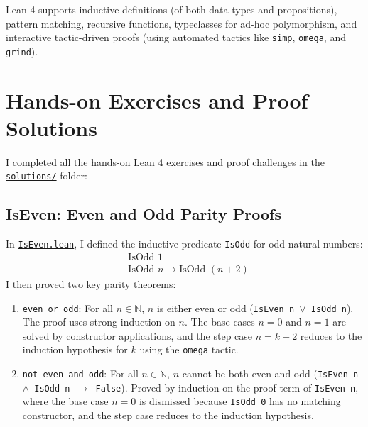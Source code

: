 \documentclass{article}
\begin{document}
Lean 4 supports inductive definitions (of both data types and propositions), pattern matching, recursive functions, typeclasses for ad-hoc polymorphism, and interactive tactic-driven proofs (using automated tactics like \texttt{simp}, \texttt{omega}, and \texttt{grind}).

\section{Hands-on Exercises and Proof Solutions}
I completed all the hands-on Lean 4 exercises and proof challenges in the \href{file:///home/scorzion/Tech/Crypto/SKC_IITH/Day9/solutions/}{\texttt{solutions/}} folder:

\subsection{IsEven: Even and Odd Parity Proofs}
In \href{file:///home/scorzion/Tech/Crypto/SKC_IITH/Day9/solutions/IsEven.lean}{\texttt{IsEven.lean}}, I defined the inductive predicate \texttt{IsOdd} for odd natural numbers:
\begin{align*}
    &\text{IsOdd } 1 \\
    &\text{IsOdd } n \to \text{IsOdd } (n + 2)
\end{align*}
I then proved two key parity theorems:
\begin{enumerate}
    \item \texttt{even\_or\_odd}: For all $n \in \mathbb{N}$, $n$ is either even or odd (\texttt{IsEven n $\lor$ IsOdd n}). The proof uses strong induction on $n$. The base cases $n=0$ and $n=1$ are solved by constructor applications, and the step case $n = k + 2$ reduces to the induction hypothesis for $k$ using the \texttt{omega} tactic.
    \item \texttt{not\_even\_and\_odd}: For all $n \in \mathbb{N}$, $n$ cannot be both even and odd (\texttt{IsEven n $\land$ IsOdd n $\to$ False}). Proved by induction on the proof term of \texttt{IsEven n}, where the base case $n=0$ is dismissed because \texttt{IsOdd 0} has no matching constructor, and the step case reduces to the induction hypothesis.
\end{enumerate}
\end{document}
